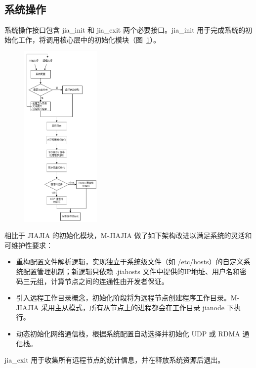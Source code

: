 {    \subsection{系统操作}\label{sec:init}
    系统操作接口包含 jia\_init 和 jia\_exit 两个必要接口。jia\_init 用于完成系统的初始化工作，将调用核心层中的初始化模块（图~\ref{fig:mjiajia-init}）。
    \begin{figure}[!htbp]
        \centering
        \includegraphics[width=0.35\textwidth]{Img/M-JIAJIA-init.png}
        \label{fig:mjiajia-init}
    \end{figure}
    相比于 JIAJIA 的初始化模块，M-JIAJIA 做了如下架构改进以满足系统的灵活和可维护性要求：
    \begin{itemize}
        \item 重构配置文件解析逻辑，实现独立于系统级文件（如 /etc/hosts）的自定义系统配置管理机制；新逻辑只依赖 .jiahosts 文件中提供的IP地址、用户名和密码三元组，计算节点之间的连通性由开发者保证。
        \item 引入远程工作目录概念，初始化阶段将为远程节点创建程序工作目录。M-JIAJIA 采用主从模式，所有从节点上的进程都会在工作目录 jianode 下执行。
        \item 动态初始化网络通信栈，根据系统配置自动选择并初始化 UDP 或 RDMA 通信栈。
    \end{itemize}

    jia\_exit 用于收集所有远程节点的统计信息，并在释放系统资源后退出。
}
